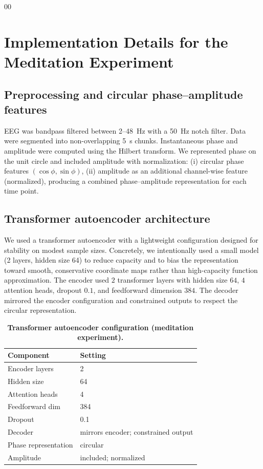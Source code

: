 \documentclass[5p,twocolumn,authoryear]{elsarticle}
\begin{document}
\begin{thebibliography}{00}
\section{Implementation Details for the Meditation Experiment}
\label{app:meditation_impl}

\subsection{Preprocessing and circular phase--amplitude features}
EEG was bandpass filtered between 2--48~Hz with a 50~Hz notch filter. Data were segmented into non-overlapping 5~s chunks. Instantaneous phase and amplitude were computed using the Hilbert transform. We represented phase on the unit circle and included amplitude with normalization:
(i) circular phase features $(\cos\phi, \sin\phi)$,
(ii) amplitude as an additional channel-wise feature (normalized), producing a combined phase--amplitude representation for each time point.

\subsection{Transformer autoencoder architecture}
\label{app:ae_arch}
We used a transformer autoencoder with a lightweight configuration designed for stability on modest sample sizes. Concretely, we intentionally used a small model (2 layers, hidden size 64) to reduce capacity and to bias the representation toward smooth, conservative coordinate maps rather than high-capacity function approximation. The encoder used $2$ transformer layers with hidden size $64$, $4$ attention heads, dropout $0.1$, and feedforward dimension $384$. The decoder mirrored the encoder configuration and constrained outputs to respect the circular representation.

\begin{table}[H]
\centering
\caption{\textbf{Transformer autoencoder configuration (meditation experiment).}}
\label{tab:med_ae_config}
\begin{tabular}{ll}
\toprule
Component & Setting \\
\midrule
Encoder layers & 2 \\
Hidden size & 64 \\
Attention heads & 4 \\
Feedforward dim & 384 \\
Dropout & 0.1 \\
Decoder & mirrors encoder; constrained output \\
Phase representation & circular \\
Amplitude & included; normalized \\
\bottomrule
\end{tabular}
\end{table}


\end{thebibliography}
\end{document}

